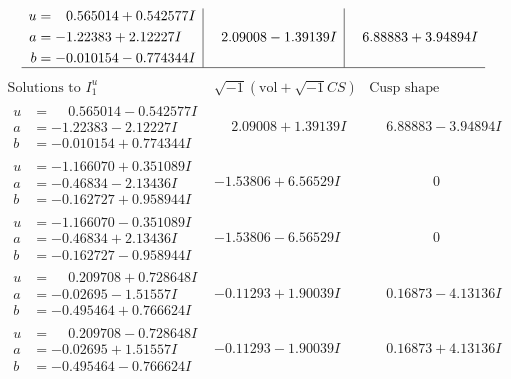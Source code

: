 \documentclass[1p]{elsarticle_modified}
\theoremstyle{definition}
\newcommand{\I}{\sqrt{-1}}
\begin{document}
$$\begin{array}{c|c|c}
\begin{aligned}
u &= \phantom{-}0.565014 + 0.542577 I \\
a &= -1.22383 + 2.12227 I \\
b &= -0.010154 - 0.774344 I\end{aligned}
 & \phantom{-}2.09008 - 1.39139 I & \phantom{-}6.88883 + 3.94894 I\\
 \hline 
 \end{array}$$\newpage$$\begin{array}{c|c|c}  
\text{Solutions to }I^u_{1}& \I (\text{vol} + \sqrt{-1}CS) & \text{Cusp shape}\\
 \hline 
\begin{aligned}
u &= \phantom{-}0.565014 - 0.542577 I \\
a &= -1.22383 - 2.12227 I \\
b &= -0.010154 + 0.774344 I\end{aligned}
 & \phantom{-}2.09008 + 1.39139 I & \phantom{-}6.88883 - 3.94894 I \\ \hline\begin{aligned}
u &= -1.166070 + 0.351089 I \\
a &= -0.46834 - 2.13436 I \\
b &= -0.162727 + 0.958944 I\end{aligned}
 & -1.53806 + 6.56529 I & \phantom{-0.000000 } 0 \\ \hline\begin{aligned}
u &= -1.166070 - 0.351089 I \\
a &= -0.46834 + 2.13436 I \\
b &= -0.162727 - 0.958944 I\end{aligned}
 & -1.53806 - 6.56529 I & \phantom{-0.000000 } 0 \\ \hline\begin{aligned}
u &= \phantom{-}0.209708 + 0.728648 I \\
a &= -0.02695 - 1.51557 I \\
b &= -0.495464 + 0.766624 I\end{aligned}
 & -0.11293 + 1.90039 I & \phantom{-}0.16873 - 4.13136 I \\ \hline\begin{aligned}
u &= \phantom{-}0.209708 - 0.728648 I \\
a &= -0.02695 + 1.51557 I \\
b &= -0.495464 - 0.766624 I\end{aligned}
 & -0.11293 - 1.90039 I & \phantom{-}0.16873 + 4.13136 I \\ \hline\begin{aligned}

\end{aligned}
\end{array}$$
\end{document}
